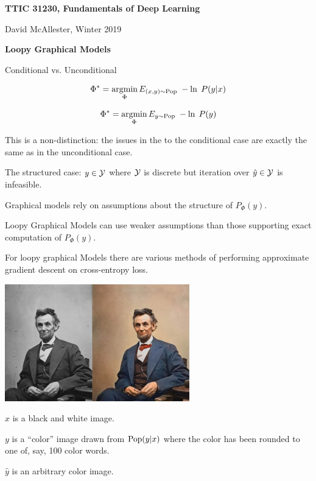 




{\Huge

  \centerline{\bf TTIC 31230, Fundamentals of Deep Learning}
  \bigskip
  \centerline{David McAllester, Winter 2019}
  \vfill
  \centerline{\bf Loopy Graphical Models}
\vfill
\vfill
\vfill
{}

Conditional vs. Unconditional

\vfill
$$\Phi^* = \operatorname*{argmin}_\Phi E_{(x,y) \sim \mathrm{Pop}}\;-\ln \;P(y|x)$$

\vfill
$$\Phi^* = \operatorname*{argmin}_\Phi E_{y \sim \mathrm{Pop}}\;-\ln \;P(y)$$

\vfill
This is a non-distinction: the issues in the to the conditional case
are exactly the same as in the unconditional case.


The structured case: $y \in {\cal Y}$ where ${\cal Y}$ is discrete but iteration over $\hat{y} \in {\cal Y}$ is infeasible.

\vfill
{\color{red} Graphical models rely on assumptions about the structure of $P_\Phi(y)$.}

\vfill
{\color{red} Loopy Graphical Models can use weaker assumptions than those supporting exact computation of $P_\Phi(y)$.}

\vfill
{\color{red} For loopy graphical Models there are various methods of performing approximate gradient descent on cross-entropy loss.}


\centerline{\includegraphics[height = 2in]{../images/colorization}}

$x$ is a black and white image.

\vfill
$y$ is a ``color'' image drawn from $\mathrm{Pop}(y|x)$ where the color has been rounded to one of, say, 100 color words.

\vfill
$\hat{y}$ is an arbitrary color image.

}
